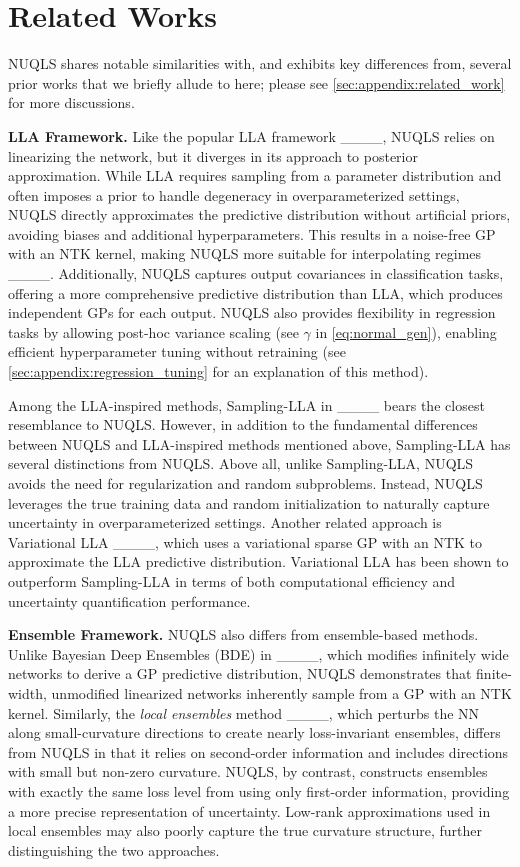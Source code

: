 \section{Related Works}
NUQLS shares notable similarities with, and exhibits key differences from, several prior works that we briefly allude to here; please see \cref{sec:appendix:related_work} for more discussions. 

\noindent
\textbf{LLA Framework.} Like the popular LLA framework ____, NUQLS relies on linearizing the network, but it diverges in its approach to posterior approximation. While LLA requires sampling from a parameter distribution and often imposes a prior to handle degeneracy in overparameterized settings, NUQLS directly approximates the predictive distribution without artificial priors, avoiding biases and additional hyperparameters. This results in a noise-free GP with an NTK kernel, making NUQLS more suitable for interpolating regimes ____. Additionally, NUQLS captures output covariances in classification tasks, offering a more comprehensive predictive distribution than LLA, which produces independent GPs for each output. NUQLS also provides flexibility in regression tasks by allowing post-hoc variance scaling (see $\gamma$ in \cref{eq:normal_gen}), enabling efficient hyperparameter tuning without retraining (see \cref{sec:appendix:regression_tuning} for an explanation of this method). 

Among the LLA-inspired methods, Sampling-LLA in ____ bears the closest resemblance to NUQLS. However, in addition to
the fundamental differences between NUQLS and LLA-inspired methods mentioned above, Sampling-LLA has several 
distinctions from NUQLS. Above all, unlike Sampling-LLA, NUQLS avoids the need for regularization and random subproblems. Instead, NUQLS leverages the true training data and random initialization to naturally capture uncertainty in overparameterized settings. Another related approach is Variational LLA ____, which uses a variational sparse GP with an NTK to approximate the LLA predictive distribution. Variational LLA has been shown to outperform Sampling-LLA in terms of both computational efficiency and uncertainty quantification performance.

\noindent
\textbf{Ensemble Framework.} NUQLS also differs from ensemble-based methods. Unlike Bayesian Deep Ensembles (BDE) in ____, which modifies infinitely wide networks to derive a GP predictive distribution, NUQLS demonstrates that finite-width, unmodified linearized networks inherently sample from a GP with an NTK kernel.  Similarly, the \textit{local ensembles} method ____, which perturbs the NN along small-curvature directions to create nearly loss-invariant ensembles, differs from NUQLS in that it relies on second-order information and includes directions with small but non-zero curvature. NUQLS, by contrast, constructs ensembles with exactly the same loss level from using only first-order information, providing a more precise representation of uncertainty. Low-rank approximations used in local ensembles may also poorly capture the true curvature structure, further distinguishing the two approaches.


